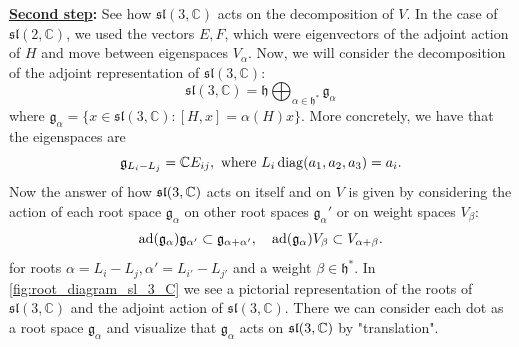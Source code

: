 \documentclass{report}
\begin{document}
{\bf \underline{Second step}:} See how $\mathfrak{sl}(3, \mathbb C)$ acts on the decomposition of $V$.
In the case of $\mathfrak{sl}(2, \mathbb C)$, we used the vectors $E, F$, which were eigenvectors of the adjoint action of $H$ and move between eigenspaces $V_\alpha$.
Now, we will consider the decomposition of the adjoint representation of $\mathfrak{sl}(3, \mathbb C)$:
\[
\mathfrak{sl}(3, \mathbb C) = \mathfrak h \bigoplus_{\alpha \in \mathfrak h^*} \mathfrak g_\alpha
\]
where $\mathfrak g_\alpha = \{ x \in \mathfrak{sl}(3, \mathbb C) : [H, x] = \alpha(H) x \}$.
More concretely, we have that the eigenspaces are
\[
\mathfrak g_{L_i - L_j} = \mathbb C E_{ij}, \text{ where } L_i \operatorname{diag}(a_1, a_2, a_3) = a_i.
\]
Now the answer of how $\operatorname{{\mathfrak{sl}}}(3,\mathbb C)$ acts on itself and on $V$ is given by considering the action of each root space $\mathfrak g_\alpha$ on other root spaces $\mathfrak g_\alpha'$ or on weight spaces $V_\beta$:
\[
    \operatorname{ad}(\mathfrak g_\alpha) \mathfrak g_{\alpha'} \subset \mathfrak g_{\alpha + \alpha'}, \quad
    \operatorname{ad}(\mathfrak g_\alpha) V_\beta \subset V_{\alpha + \beta}.
\]
for roots $\alpha = L_i - L_j, \alpha' = L_{i'} - L_{j'}$ and a weight $\beta \in \mathfrak h^*$.
In \cref{fig:root_diagram_sl_3_C} we see a pictorial representation of the roots of $\mathfrak{sl}(3, \mathbb C)$ and the adjoint action of $\mathfrak{sl}(3,\mathbb C)$.
There we can consider each dot as a root space $\mathfrak g_\alpha$ and visualize that $\mathfrak g_\alpha$ acts on $\operatorname{{\mathfrak{sl}}}(3, \mathbb C)$ by "translation". 
\end{document}
